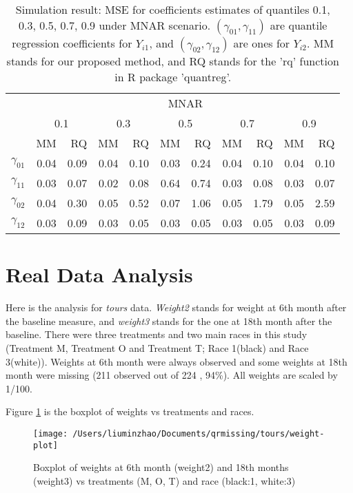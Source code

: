 \documentclass[12pt]{article}
\begin{document}
\begin{table}[h]
  \renewcommand{\arraystretch}{1.3}
  \centering
  \caption{Simulation result: MSE for coefficients estimates of quantiles
    0.1, 0.3, 0.5, 0.7, 0.9 under MNAR scenario. $(\gamma_{01}, \gamma_{11})$ 
    are quantile regression coefficients for $Y_{i1}$, and $(\gamma_{02}, \gamma_{12})$ 
    are ones for $Y_{i2}$. MM stands for our proposed method, and RQ stands for the 'rq' 
    function in R package 'quantreg'.}
  \vspace{10pt}
  \begin{tabular}{rrrrrrrrrrr}
    \toprule
    & \multicolumn{ 10}{c}{MNAR} \\
    \cline{2-11}
    &  \multicolumn{2}{c}{0.1} &  \multicolumn{2}{c}{0.3} &  \multicolumn{2}{c}{0.5} 
&  \multicolumn{2}{c}{0.7} &  \multicolumn{2}{c}{0.9} \\
    \cline{2-11}
    & MM & RQ    & MM & RQ    & MM & RQ    & MM & RQ    & MM & RQ \\
    \hline
    $\gamma_{01}$ & 0.04 &0.09&0.04 &0.10 &0.03 &0.24 &0.04 &0.10 &0.04 &0.10 \\
    $\gamma_{11}$ & 0.03 &0.07&0.02 &0.08 &0.64 &0.74 &0.03 &0.08 &0.03 &0.07 \\ 
    $\gamma_{02}$ & 0.04 &0.30&0.05 &0.52 &0.07 &1.06 &0.05 &1.79 &0.05 &2.59 \\ 
    $\gamma_{12}$ & 0.03 &0.09&0.03 &0.05 &0.03 &0.05 &0.03 &0.05 &0.03 &0.09 \\ 
    \bottomrule
  \end{tabular}  \label{tab:sim2}
\end{table}


\section{Real Data Analysis}
\label{sec:real}
Here is the analysis for \textit{tours} data. \textit{Weight2} stands
for weight at 6th month after the baseline measure, and
\textit{weight3} stands for the one at 18th month after the
baseline. There were three treatments and two main races in this study
(Treatment M, Treatment O and Treatment T; Race 1(black) and Race
3(white)). Weights at 6th month were always observed and some weights
at 18th month were missing (211 observed out of 224 , 94\%). All
weights are scaled by 1/100.

Figure \ref{fig:tours} is the boxplot of weights vs treatments and races.

\begin{figure}[htb]
  \centerline{\texttt{[image: /Users/liuminzhao/Documents/qrmissing/tours/weight-plot]}}
  \caption[]{\label{fig:tours} Boxplot of weights at 6th month
    (weight2) and 18th months (weight3) vs treatments (M, O, T) and
    race (black:1, white:3)}
\end{figure}
\end{document}
